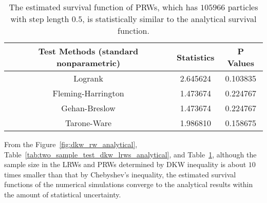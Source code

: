 \begin{table}
  \centering
  \begin{tabular}{|c|c|c|}\hline
    Test Methods (standard nonparametric) & Statistics & P Values \\
    \hline
    Logrank & 2.645624 & 0.103835 \\
    \hline
    Fleming-Harrington & 1.473674 & 0.224767 \\
    \hline
    Gehan-Breslow & 1.473674 & 0.224767 \\
    \hline
    Tarone-Ware & 1.986810 & 0.158675 \\
    \hline
  \end{tabular}
  \caption{The estimated survival function of PRWs, which has
    $105966$ particles with step length $0.5$, is statistically
    similar to the analytical survival function.}
  \label{tab:two_sample_test_dkw_prws_analytical}
\end{table}

From the Figure~\ref{fig:dkw_rw_analytical},
Table~\ref{tab:two_sample_test_dkw_lrws_analytical}, and
Table~\ref{tab:two_sample_test_dkw_prws_analytical}, although the sample
size in the LRWs and PRWs determined by DKW inequality is about $10$
times smaller than that by Chebyshev’s inequality, the estimated
survival functions of the numerical simulations converge to the
analytical results within the amount of statistical uncertainty.
